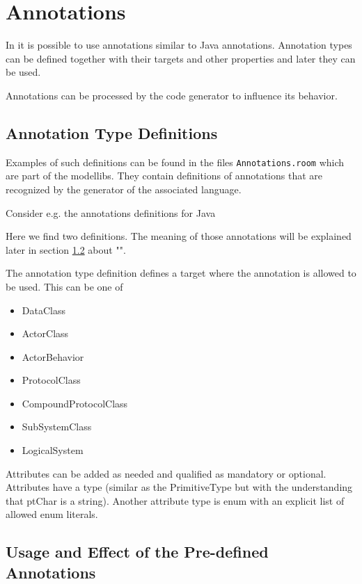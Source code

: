 \section{Annotations}

In \eTrice{} it is possible to use annotations similar to Java annotations.
Annotation types can be defined together with their targets and other properties and
later they can be used.

Annotations can be processed by the code generator to influence its behavior.

\subsection{Annotation Type Definitions}

Examples of such definitions can be found in the files \texttt{Annotations.room} which are part of the modellibs.
They contain definitions of annotations that are recognized by the generator of the associated language.

Consider e.g. the annotations definitions for Java



Here we find two definitions. The meaning of those annotations will be explained later in section
\ref{sec:predef_annotations} about "".

The annotation type definition defines a target where the annotation is allowed to be used.
This can be one of

\begin{itemize}
\item DataClass
\item ActorClass
\item ActorBehavior
\item ProtocolClass
\item CompoundProtocolClass
\item SubSystemClass
\item LogicalSystem
\end{itemize}

Attributes can be added as needed and qualified as mandatory or optional.
Attributes have a type (similar as the PrimitiveType but with the understanding that
ptChar is a string). Another attribute type is enum with an explicit list of allowed
enum literals.

\subsection{Usage and Effect of the Pre-defined Annotations}
\label{sec:predef_annotations}

